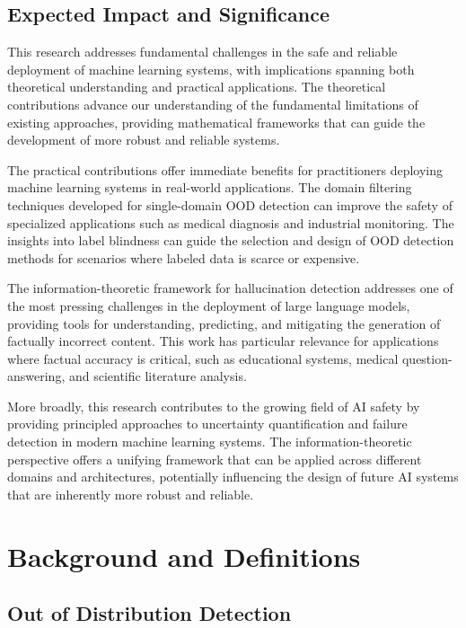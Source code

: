 \documentclass[11pt, oneside]{book}
\theoremstyle{plain}
\theoremstyle{definition}
\theoremstyle{remark}
\begin{document}
\section{Expected Impact and Significance}

This research addresses fundamental challenges in the safe and reliable deployment of machine learning systems, with implications spanning both theoretical understanding and practical applications. The theoretical contributions advance our understanding of the fundamental limitations of existing approaches, providing mathematical frameworks that can guide the development of more robust and reliable systems.

The practical contributions offer immediate benefits for practitioners deploying machine learning systems in real-world applications. The domain filtering techniques developed for single-domain OOD detection can improve the safety of specialized applications such as medical diagnosis and industrial monitoring. The insights into label blindness can guide the selection and design of OOD detection methods for scenarios where labeled data is scarce or expensive.

The information-theoretic framework for hallucination detection addresses one of the most pressing challenges in the deployment of large language models, providing tools for understanding, predicting, and mitigating the generation of factually incorrect content. This work has particular relevance for applications where factual accuracy is critical, such as educational systems, medical question-answering, and scientific literature analysis.

More broadly, this research contributes to the growing field of AI safety by providing principled approaches to uncertainty quantification and failure detection in modern machine learning systems. The information-theoretic perspective offers a unifying framework that can be applied across different domains and architectures, potentially influencing the design of future AI systems that are inherently more robust and reliable.

\chapter{Background and Definitions}

\section{Out of Distribution Detection}
\end{document}
